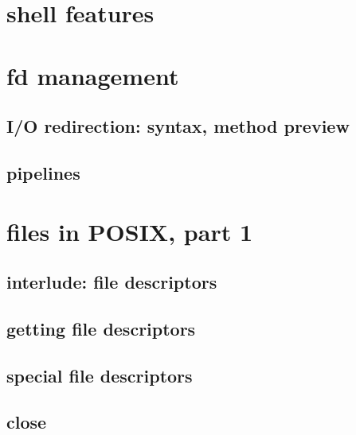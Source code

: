 


\section{shell features}


\section{fd management}
\subsection{I/O redirection: syntax, method preview}


\subsection{pipelines}


\section{files in POSIX, part 1}

\subsection{interlude: file descriptors}



\subsection{getting file descriptors}



\subsection{special file descriptors}



\subsection{close}



